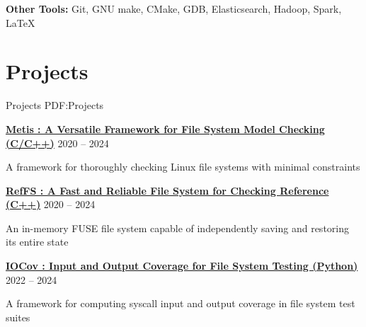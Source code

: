 \documentclass[a4paper,10pt,oneside]{article}
\begin{document}
\begin{body}
\GapNoBreak

\BulletItem
\textbf{Other Tools:} Git, GNU make, CMake, GDB, Elasticsearch, Hadoop, Spark, {\LaTeX}


\GapNoBreak

\section
{Projects}
{Projects}
{PDF:Projects}

\href{https://github.com/sbu-fsl/Metis}
{\textbf{Metis : A Versatile Framework for File System Model Checking (C/C++)}}
\hfill
2020 -- 
2024

\BulletItem
A framework for thoroughly checking Linux file systems with minimal constraints

\href{https://github.com/sbu-fsl/RefFS}
{\textbf{RefFS : A Fast and Reliable File System for Checking Reference (C++)}}
\hfill
2020 -- 
2024

\BulletItem
An in-memory FUSE file system capable of independently saving and restoring its entire state

\href{https://github.com/sbu-fsl/IOCov}
{\textbf{IOCov : Input and Output Coverage for File System Testing (Python)}}
\hfill
2022 -- 
2024

\BulletItem
A framework for computing syscall input and output coverage in file system test suites










\end{body}
\end{document}
